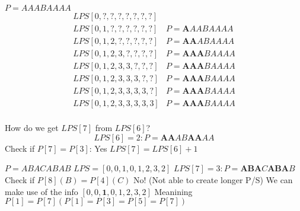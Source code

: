 \documentclass{article}
\begin{document}
\(P = AAABAAAA\)
\begin{align*}
    LPS[0,?,?,?,?,?,?,?] &                       \\
    LPS[0,1,?,?,?,?,?,?] & P = \mathbf{A}AABAAAA \\
    LPS[0,1,2,?,?,?,?,?] & P = \mathbf{AA}ABAAAA \\
    LPS[0,1,2,3,?,?,?,?] & P = \mathbf{AAA}BAAAA \\
    LPS[0,1,2,3,3,?,?,?] & P = \mathbf{AAA}BAAAA \\
    LPS[0,1,2,3,3,3,?,?] & P = \mathbf{AAA}BAAAA \\
    LPS[0,1,2,3,3,3,3,?] & P = \mathbf{AAA}BAAAA \\
    LPS[0,1,2,3,3,3,3,3] & P = \mathbf{AAA}BAAAA \\
\end{align*}

How do we get \(LPS[7]\) from \(LPS[6]\)?
\begin{equation*}
    LPS[6] = 2: P = \mathbf{AA}AB\mathbf{AA}AA
\end{equation*}
Check if \(P[7] = P[3]\): Yes \(LPS[7] = LPS[6] + 1\)

\(P=ABACABAB\)
\(LPS=[0,0,1,0,1,2,3,2]\)
\(LPS[7] = 3: P = \mathbf{ABA}C\mathbf{ABA}B\)
Check if \(P[8](B) = P[4](C)\) No! (Not able to create longer P/S)
We can make use of the info \([0, 0, \mathbf{1}, 0, 1, 2, 3, 2]\)
Meanining \(P[1] = P[7] (P[1] = P[3] = P[5] = P[7])\)
\end{document}
